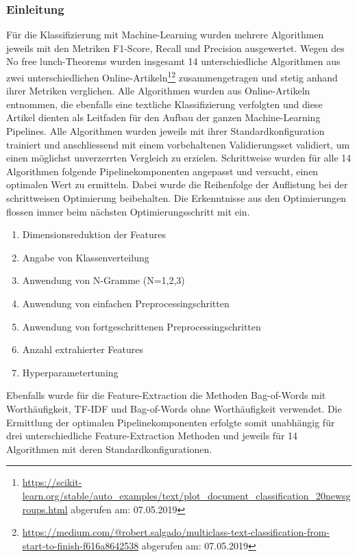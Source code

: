 \subsubsection{Einleitung}
Für die Klassifizierung mit Machine-Learning wurden mehrere Algorithmen jeweils mit den Metriken F1-Score, Recall und Precision ausgewertet.
Wegen des \glqq No free lunch\grqq{}-Theorems wurden insgesamt 14 unterschiedliche Algorithmen aus zwei unterschiedlichen Online-Artikeln\footnote{\url{https://scikit-learn.org/stable/auto_examples/text/plot_document_classification_20newsgroups.html} abgerufen am: 07.05.2019}\footnote{\url{https://medium.com/@robert.salgado/multiclass-text-classification-from-start-to-finish-f616a8642538} abgerufen am: 07.05.2019} zusammengetragen und stetig anhand ihrer Metriken verglichen.
Alle Algorithmen wurden aus Online-Artikeln entnommen, die ebenfalls eine textliche Klassifizierung verfolgten und diese Artikel dienten als Leitfaden für den Aufbau der ganzen Machine-Learning Pipelines.
Alle Algorithmen wurden jeweils mit ihrer Standardkonfiguration trainiert und anschliessend mit einem vorbehaltenen Validierungsset validiert, um einen möglichst unverzerrten Vergleich zu erzielen.
Schrittweise wurden für alle 14 Algorithmen folgende Pipelinekomponenten angepasst und versucht, einen optimalen Wert zu ermitteln.
Dabei wurde die Reihenfolge der Auflistung bei der schrittweisen Optimierung beibehalten.
Die Erkenntnisse aus den Optimierungen flossen immer beim nächsten Optimierungsschritt mit ein.
\begin{enumerate}
	\item Dimensionsreduktion der Features 
	\item Angabe von Klassenverteilung
	\item Anwendung von N-Gramme (N={1,2,3})
	\item Anwendung von einfachen Preprocessingschritten
	\item Anwendung von fortgeschrittenen Preprocessingschritten
	\item Anzahl extrahierter Features
	\item Hyperparametertuning
\end{enumerate}
Ebenfalls wurde für die Feature-Extraction die Methoden Bag-of-Words mit Worthäufigkeit, TF-IDF und Bag-of-Words ohne Worthäufigkeit verwendet.
Die Ermittlung der optimalen Pipelinekomponenten erfolgte somit unabhängig für drei unterschiedliche Feature-Extraction Methoden und jeweils für 14 Algorithmen mit deren Standardkonfigurationen.
